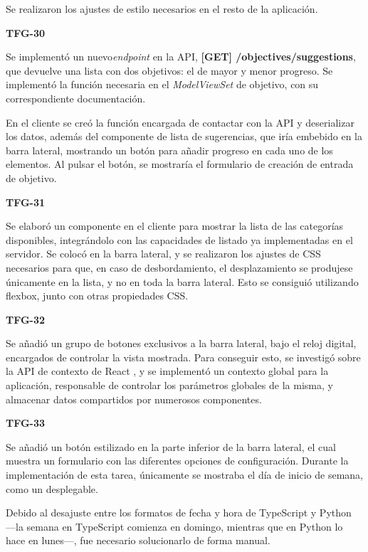 \documentclass[10pt, a4paper]{aqademic}
\begin{document}
Se realizaron los ajustes de estilo necesarios en el resto de la aplicación.

\medskip

\textbf{TFG-30}

Se implementó un nuevo\textit{endpoint} en la API, \textbf{[GET] /objectives/suggestions}, que devuelve una lista con dos objetivos: el de mayor y menor progreso. Se implementó la función necesaria en el \textit{ModelViewSet} de objetivo, con su correspondiente documentación. 

En el cliente se creó la función encargada de contactar con la API y deserializar los datos, además del componente de lista de sugerencias, que iría embebido en la barra lateral, mostrando un botón para añadir progreso en cada uno de los elementos. Al pulsar el botón, se mostraría el formulario de creación de entrada de objetivo.

\medskip

\textbf{TFG-31}

Se elaboró un componente en el cliente para mostrar la lista de las categorías disponibles, integrándolo con las capacidades de listado ya implementadas en el servidor. Se colocó en la barra lateral, y se realizaron los ajustes de CSS necesarios para que, en caso de desbordamiento, el desplazamiento se produjese únicamente en la lista, y no en toda la barra lateral. Esto se consiguió utilizando flexbox, junto con otras propiedades CSS.

\medskip


\textbf{TFG-32}

Se añadió un grupo de botones exclusivos a la barra lateral, bajo el reloj digital, encargados de controlar la vista mostrada. Para conseguir esto, se investigó sobre la API de contexto de React \cite{noauthor_context_nodate}, y se implementó un contexto global para la aplicación, responsable de controlar los parámetros globales de la misma, y almacenar datos compartidos por numerosos componentes.

\medskip


\textbf{TFG-33}

Se añadió un botón estilizado en la parte inferior de la barra lateral, el cual muestra un formulario con las diferentes opciones de configuración. Durante la implementación de esta tarea, únicamente se mostraba el día de inicio de semana, como un desplegable.

Debido al desajuste entre los formatos de fecha y hora de TypeScript y Python ---la semana en TypeScript comienza en domingo, mientras que en Python lo hace en lunes---, fue necesario solucionarlo de forma manual.
\end{document}
